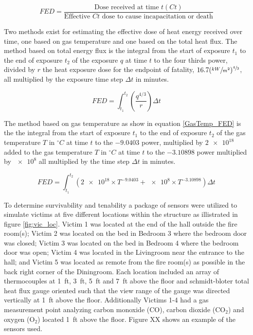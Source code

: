 \documentclass[12pt,oneside]{book}
\begin{document}
\begin{equation}
	FED = \frac{\text{Dose received at time } t(Ct)}{\text{Effective } Ct \text{ dose to cause incapacitation or death}}
	\label{FED_gas}
\end{equation} 

Two methods exist for estimating the effective dose of heat energy received over time, one based on gas temperature and one based on the total heat flux. The method based on total energy flux is the integral from the start of exposure $t_1$ to the end of exposure $t_2$ of the exposure $q$ at time $t$ to the four thirds power, divided by $r$ the heat exposure dose for the endpoint of fatality, $16.7(\sfrac{kW}{m^2})^{\sfrac{4}{3}}$, all multiplied by the exposure time step $\Delta t$ in minutes. \cite{SFPE:Purser}

\begin{equation} \label{TotalFlux_FED}
	FED = \int_{t_1}^{t_2} \left( \frac{q^{4/3}}{r} \right) \Delta t
\end{equation}

The method based on gas temperature as show in equation \ref{GasTemp_FED} is the the integral from the start of exposure $t_1$ to the end of exposure $t_2$ of the gas temperature $T$ in $^{\circ}C$ at time $t$ to the $-9.0403$ power, multiplied by $\num{2e18}$ added to the gas temperature $T$ in $^{\circ}C$ at time $t$ to the $-3.10898$ power multiplied by $\num{e8}$ all multiplied by the time step $\Delta t$ in minutes. \cite{SFPE:Purser}

\begin{equation} \label{GasTemp_FED}
	FED = \int_{t_1}^{t_2} \left( \num{2e18} \times T^{-9.0403} + \num{e8} \times T^{-3.10898} \right) \Delta t
\end{equation}

To determine survivability and tenability a package of sensors were utilized to simulate victims at five different locations within the structure as illistrated in figure \ref{fig:vic_loc}. Victim 1 was located at the end of the hall outside the fire room(s); Victim 2 was located on the bed in Bedroom 3 where the bedroom door was closed; Victim 3 was located on the bed in Bedroom 4 where the bedroom door was open; Victim 4 was located in the Livingroom near the entrance to the hall; and Victim 5 was located as remote from the fire room(s) as possible in the back right corner of the Diningroom. Each location included an array of thermocouples at 1~ft, 3~ft, 5~ft and 7~ft above the floor and schmidt-bloter total heat flux gauge oriented such that the view range of the gauge was directed vertically at 1~ft above the floor. Additionally Victims 1-4 had a gas measurement point analyzing carbon monoxide (CO), carbon dioxide (CO$_{2}$) and oxygen (O$_{2}$) located 1~ft above the floor. Figure XX shows an example of the sensors used. 
\end{document}
